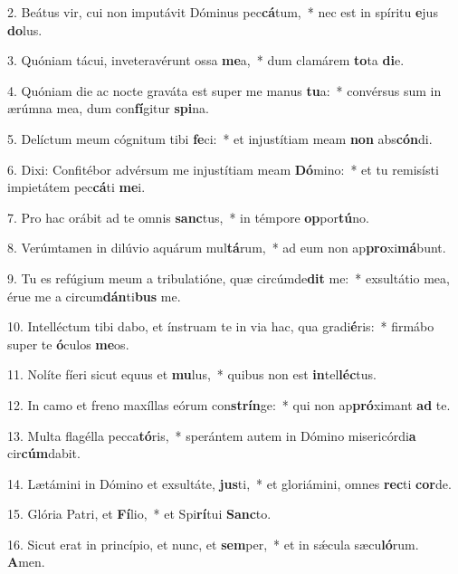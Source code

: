 2. Beátus vir, cui non imputávit Dóminus pec\textbf{cá}tum,~*  nec est in spíritu \textbf{e}jus \textbf{do}lus.\

3. Quóniam tácui, inveteravérunt ossa \textbf{me}a,~*  dum clamárem \textbf{to}ta \textbf{di}e.\

4. Quóniam die ac nocte graváta est super me manus \textbf{tu}a:~*  convérsus sum in ærúmna mea, dum con\textbf{fí}gitur \textbf{spi}na.\

5. Delíctum meum cógnitum tibi \textbf{fe}ci:~*  et injustítiam meam \textbf{non} abs\textbf{cón}di.\

6. Dixi: Confitébor advérsum me injustítiam meam \textbf{Dó}mino:~*  et tu remisísti impietátem pec\textbf{cá}ti \textbf{me}i.\

7. Pro hac orábit ad te omnis \textbf{sanc}tus,~*  in témpore \textbf{op}por\textbf{tú}no.\

8. Verúmtamen in dilúvio aquárum mul\textbf{tá}rum,~*  ad eum non ap\textbf{pro}xi\textbf{má}bunt.\

9. Tu es refúgium meum a tribulatióne, quæ circúmde\textbf{dit} me:~*  exsultátio mea, érue me a circum\textbf{dán}ti\textbf{bus} me.\

10. Intelléctum tibi dabo, et ínstruam te in via hac, qua gradi\textbf{é}ris:~*  firmábo super te \textbf{ó}culos \textbf{me}os.\

11. Nolíte fíeri sicut equus et \textbf{mu}lus,~*  quibus non est \textbf{in}tel\textbf{léc}tus.\

12. In camo et freno maxíllas eórum con\textbf{strín}ge:~*  qui non ap\textbf{pró}ximant \textbf{ad} te.\

13. Multa flagélla pecca\textbf{tó}ris,~*  sperántem autem in Dómino misericórdi\textbf{a} cir\textbf{cúm}dabit.\

14. Lætámini in Dómino et exsultáte, \textbf{jus}ti,~*  et gloriámini, omnes \textbf{rec}ti \textbf{cor}de.\

15. Glória Patri, et \textbf{Fí}lio,~*  et Spi\textbf{rí}tui \textbf{Sanc}to.\

16. Sicut erat in princípio, et nunc, et \textbf{sem}per,~*  et in sǽcula sæcu\textbf{ló}rum. \textbf{A}men.\

